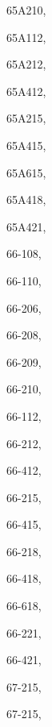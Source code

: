 \documentclass[11pt]{book}
\begin{document}
\begin{theindex}
 \item 65A210, \hyperref[s65A210]{\pageref{s65A210}}
 \item 65A112, \hyperref[s65A112]{\pageref{s65A112}}
 \item 65A212, \hyperref[s65A212]{\pageref{s65A212}}
 \item 65A412, \hyperref[s65A412]{\pageref{s65A412}}
 \item 65A215, \hyperref[s65A215]{\pageref{s65A215}}
 \item 65A415, \hyperref[s65A415]{\pageref{s65A415}}
 \item 65A615, \hyperref[s65A615]{\pageref{s65A615}}
 \item 65A418, \hyperref[s65A418]{\pageref{s65A418}}
 \item 65A421, \hyperref[s65A421]{\pageref{s65A421}}
 \item 66-108, \hyperref[s66-108]{\pageref{s66-108}}
 \item 66-110, \hyperref[s66-110]{\pageref{s66-110}}
 \item 66-206, \hyperref[s66-206]{\pageref{s66-206}}
 \item 66-208, \hyperref[s66-208]{\pageref{s66-208}}
 \item 66-209, \hyperref[s66-209]{\pageref{s66-209}}
 \item 66-210, \hyperref[s66-210]{\pageref{s66-210}}
 \item 66-112, \hyperref[s66-112]{\pageref{s66-112}}
 \item 66-212, \hyperref[s66-212]{\pageref{s66-212}}
 \item 66-412, \hyperref[s66-412]{\pageref{s66-412}}
 \item 66-215, \hyperref[s66-215]{\pageref{s66-215}}
 \item 66-415, \hyperref[s66-415]{\pageref{s66-415}}
 \item 66-218, \hyperref[s66-218]{\pageref{s66-218}}
 \item 66-418, \hyperref[s66-418]{\pageref{s66-418}}
 \item 66-618, \hyperref[s66-618]{\pageref{s63-618}}
 \item 66-221, \hyperref[s66-221]{\pageref{s66-221}}
 \item 66-421, \hyperref[s66-421]{\pageref{s66-421}}
 \item 67-215, \hyperref[s67-212]{\pageref{s67-212}}
 \item 67-215, \hyperref[s67-215]{\pageref{s67-215}}
 \end{theindex}
 \onecolumn
  
\end{document}
